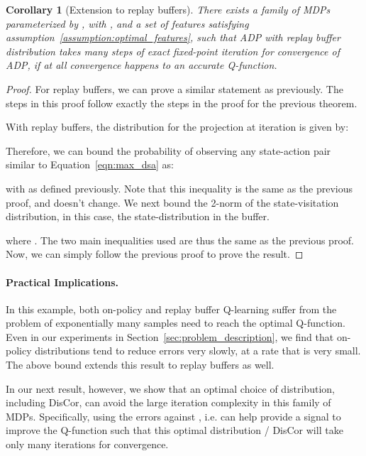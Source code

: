\documentclass[jmlr]{article}
\newtheorem{corollary}{Corollary}[theorem]
\begin{document}
\begin{corollary}[Extension to replay buffers]
There exists a family of MDPs parameterized by , with ,  and a set of features  satisfying assumption~\ref{assumption:optimal_features}, such that ADP with replay buffer distribution takes  many steps of exact fixed-point iteration for convergence of ADP, if at all convergence happens to an accurate Q-function.
\end{corollary}
\begin{proof}
For replay buffers, we can prove a similar statement as previously. The steps in this proof follow exactly the steps in the proof for the previous theorem.

With replay buffers, the distribution for the projection at iteration  is given by:

Therefore, we can bound the probability of observing any state-action pair similar to Equation~\ref{eqn:max_dsa} as:

with  as defined previously. Note that this inequality is the same as the previous proof, and doesn't change. We next bound the 2-norm of the state-visitation distribution, in this case, the state-distribution in the buffer.

where . The two main inequalities used are thus the same as the previous proof. Now, we can simply follow the previous proof to prove the result.
\end{proof}

\paragraph{Practical Implications.} In this example, both on-policy and replay buffer Q-learning suffer from the problem of exponentially many samples need to reach the optimal Q-function. Even in our experiments in Section~\ref{sec:problem_description}, we find that on-policy distributions tend to reduce errors very slowly, at a rate that is very small. The above bound extends this result to replay buffers as well. 

In our next result, however, we show that an optimal choice of distribution, including DisCor, can avoid the large iteration complexity in this family of MDPs. Specifically, using the errors against , i.e.  can help provide a signal to improve the Q-function such that this optimal distribution / DisCor will take only  many iterations for convergence.
\end{document}
